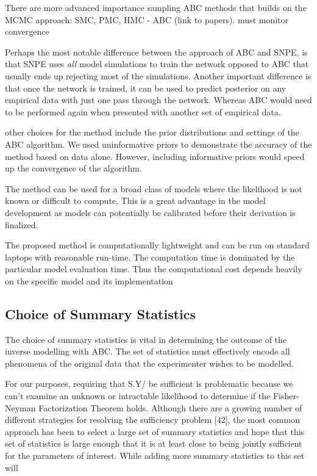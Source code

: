 There are more advanced importance sampling ABC methods that builds on the MCMC approach: SMC, PMC, HMC - ABC (link to papers). must monitor convergence

Perhaps the most notable difference between the approach of ABC and SNPE, is that SNPE uses \textit{all} model simulations to train the network opposed to ABC that usually ends up rejecting most of the simulations. Another important difference is that once the network is trained, it can be used to predict posterior on any empirical data with just one pass through the network. Whereas ABC would need to be performed again when presented with another set of empirical data. 


other choices for the method include the prior distributions and settings of the ABC algorithm. We used uninformative priors to demonstrate the accuracy of the method based on data alone. However, including informative priors would speed up the convergence of the algorithm. 

The method can be used for a broad class of models where the likelihood is not known or difficult to compute, This is a great advantage in the model development as models can potentially be calibrated before their derivation is finalized.

The proposed method is computationally lightweight and can be run on standard laptops with reasonable run-time. The computation time is dominated by the particular model evaluation time. Thus the computational cost depends heavily on the specific model and its implementation

\subsection{Choice of Summary Statistics}

The choice of summary statistics is vital in determining the outcome of the inverse modelling with ABC. The set of statistics must effectively encode all phenomena of the original data that the experimenter wishes to be modelled. 

For our purposes, requiring that S.Y/ be sufficient is problematic because we
can’t examine an unknown or intractable likelihood to determine if the Fisher- Neyman Factorization Theorem holds. Although there are a growing number of different strategies for resolving the sufficiency problem [42], the most common approach has been to select a large set of summary statistics and hope that this set of statistics is large enough that it is at least close to being jointly sufficient for the parameters of interest. While adding more summary statistics to this set will

